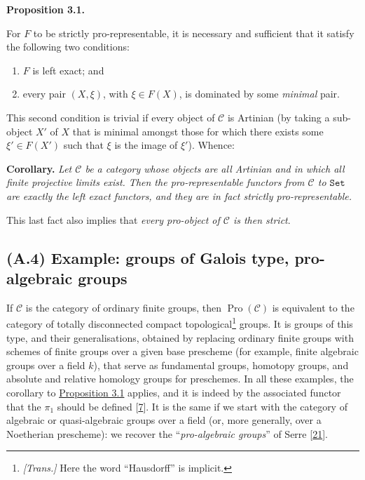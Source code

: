 \documentclass{article}
\providecommand{\tightlist}{%
  \setlength{\itemsep}{0pt}\setlength{\parskip}{0pt}}
\newenvironment{itenv}[1]
  {\phantomsection\par\smallskip\noindent\textbf{#1.}\itshape}
  {\par\smallskip}
\theoremstyle{definition}
\theoremstyle{definition}
\theoremstyle{definition}
\theoremstyle{definition}
\theoremstyle{remark}
\begin{document}
\hypertarget{fga-3-ii-section-A.3-proposition-3.1}{}
\begin{itenv}{Proposition 3.1}

For \(F\) to be strictly pro-representable, it is necessary and sufficient that it satisfy the following two conditions:

\begin{enumerate}
\def\labelenumi{\roman{enumi}.}
\tightlist
\item
  \(F\) is left exact; and
\item
  every pair \((X,\xi)\), with \(\xi\in F(X)\), is dominated by some \emph{minimal} pair.
\end{enumerate}

\end{itenv}

This second condition is trivial if every object of \({\mathcal{C}}\) is Artinian (by taking a sub-object \(X'\) of \(X\) that is minimal amongst those for which there exists some \(\xi'\in F(X')\) such that \(\xi\) is the image of \(\xi'\)).
Whence:

\begin{itenv}{Corollary}
Let \({\mathcal{C}}\) be a category whose objects are all Artinian and in which all finite projective limits exist.
Then the pro-representable functors from \({\mathcal{C}}\) to \(\mathtt{Set}\) are exactly the left exact functors, and they are in fact strictly pro-representable.

\end{itenv}

This last fact also implies that \emph{every pro-object of \({\mathcal{C}}\) is then strict}.

\hypertarget{fga-3-ii-section-A.4}{%
\subsection{(A.4) Example: groups of Galois type, pro-algebraic groups}\label{fga-3-ii-section-A.4}}

If \({\mathcal{C}}\) is the category of ordinary finite groups, then \(\operatorname{Pro}({\mathcal{C}})\) is equivalent to the category of totally disconnected compact topological\footnote{\emph{{[}Trans.{]}} Here the word ``Hausdorff'' is implicit.} groups.
It is groups of this type, and their generalisations, obtained by replacing ordinary finite groups with schemes of finite groups over a given base prescheme (for example, finite algebraic groups over a field \(k\)), that serve as fundamental groups, homotopy groups, and absolute and relative homology groups for preschemes.
In all these examples, the corollary to \protect\hyperlink{fga-3-ii-section-A.3-proposition-3.1}{Proposition 3.1} applies, and it is indeed by the associated functor that the \(\pi_1\) should be defined {[}\protect\hyperlink{ref-Gro1958a}{7}{]}.
It is the same if we start with the category of algebraic or quasi-algebraic groups over a field (or, more generally, over a Noetherian prescheme): we recover the ``\emph{pro-algebraic groups}'' of Serre {[}\protect\hyperlink{ref-Ser1958}{21}{]}.
\end{document}
